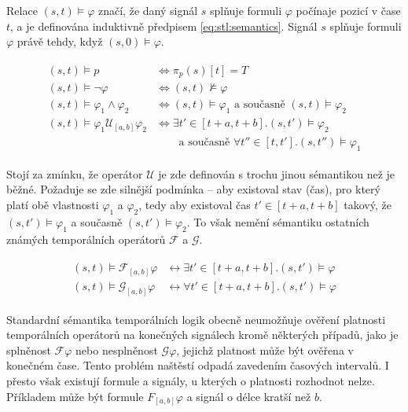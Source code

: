 Re\-la\-ce $(s, t) \models \varphi$ značí, že daný signál $s$ splňuje formuli $\varphi$
počínaje pozicí v čase $t$, a je definována induktivně předpisem \ref{eq:stl:semantics}.
Signál $s$ splňuje formuli $\varphi$ právě tehdy, když $(s, 0) \models \varphi$.

\begin{align}\label{eq:stl:semantics}
\begin{array}{ll}
(s, t) \models p				&\Longleftrightarrow \pi_p(s)[t] = T			\\
(s, t) \models \neg \varphi		&\Longleftrightarrow (s, t) \not\models \varphi	\\
(s, t) \models \varphi_1 \wedge \varphi_2	&\Longleftrightarrow (s, t) \models \varphi_1 \textrm{ a současně } (s, t) \models \varphi_2	\\
(s, t) \models \varphi_1 \mathcal{U}_{[a,b]} \varphi_2 	&\Longleftrightarrow \exists t' \in [t+a, t+b] . (s, t') \models \varphi_2			\\														
&~~~~~~~~\textrm{ a současně } \forall t'' \in [t, t'] . (s, t'') \models \varphi_1
\end{array}
\end{align}

Stojí za zmínku, že operátor $\mathcal{U}$ je zde definován s trochu jinou sé\-man\-ti\-kou
než je běžné. Požaduje se zde silnější podmínka -- aby existoval stav (čas),
pro který platí obě vlastnosti $\varphi_1$ a $\varphi_2$, tedy aby existoval
čas $t' \in [t + a, t + b]$ takový, že $(s, t') \models \varphi_1$
a současně $(s, t') \models \varphi_2$. To však nemění sémantiku ostatních známých
temporálních operátorů $\mathcal{F}$ a $\mathcal{G}$.

\begin{align}\label{eq:stl:semantics}
\begin{array}{ll}
(s, t) \models \mathcal{F}_{[a,b]}\varphi &\longleftrightarrow	\exists t'\in[t+a, t+b].(s,t') \models \varphi		\\
(s, t) \models \mathcal{G}_{[a,b]}\varphi &\longleftrightarrow	\forall t'\in[t+a, t+b].(s,t') \models \varphi
\end{array}
\end{align}

Standardní sémantika temporálních logik obecně neumožňuje ověření platnosti temporálních operátorů
na konečných signálech kromě některých případů, jako je splněnost $\mathcal{F}\varphi$
nebo nesplněnost $\mathcal{G}\varphi$, jejichž platnost může být ověřena v konečném čase.
Tento problém naštěstí odpadá zavedením časových intervalů. I přesto však existují
formule a signály, u kterých o platnosti rozhodnot nelze. Příkladem může být formule $F_{[a, b]}\varphi$
a signál o délce kratší než $b$.

